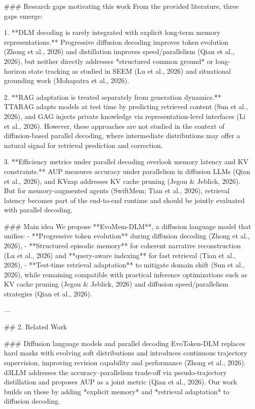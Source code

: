 ### Research gaps motivating this work  
From the provided literature, three gaps emerge:

1. **DLM decoding is rarely integrated with explicit long-term memory representations.**  
   Progressive diffusion decoding improves token evolution (Zhong et al., 2026) and distillation improves speed/parallelism (Qian et al., 2026), but neither directly addresses *structured common ground* or long-horizon state tracking as studied in SEEM (Lu et al., 2026) and situational grounding work (Mohapatra et al., 2026).

2. **RAG adaptation is treated separately from generation dynamics.**  
   TTARAG adapts models at test time by predicting retrieved content (Sun et al., 2026), and GAG injects private knowledge via representation-level interfaces (Li et al., 2026). However, these approaches are not studied in the context of diffusion-based parallel decoding, where intermediate distributions may offer a natural signal for retrieval prediction and correction.

3. **Efficiency metrics under parallel decoding overlook memory latency and KV constraints.**  
   AUP measures accuracy under parallelism in diffusion LLMs (Qian et al., 2026), and KVzap addresses KV cache pruning (Jegou & Jeblick, 2026). But for memory-augmented agents (SwiftMem; Tian et al., 2026), retrieval latency becomes part of the end-to-end runtime and should be jointly evaluated with parallel decoding.

### Main idea  
We propose **EvoMem-DLM**, a diffusion language model that unifies:
- **Progressive token evolution** during diffusion decoding (Zhong et al., 2026),
- **Structured episodic memory** for coherent narrative reconstruction (Lu et al., 2026) and **query-aware indexing** for fast retrieval (Tian et al., 2026),
- **Test-time retrieval adaptation** to mitigate domain shift (Sun et al., 2026),
while remaining compatible with practical inference optimizations such as KV cache pruning (Jegou & Jeblick, 2026) and diffusion speed/parallelism strategies (Qian et al., 2026).

---

## 2. Related Work  

### Diffusion language models and parallel decoding  
EvoToken-DLM replaces hard masks with evolving soft distributions and introduces continuous trajectory supervision, improving revision capability and performance (Zhong et al., 2026). d3LLM addresses the accuracy–parallelism trade-off via pseudo-trajectory distillation and proposes AUP as a joint metric (Qian et al., 2026). Our work builds on these by adding *explicit memory* and *retrieval adaptation* to diffusion decoding.

